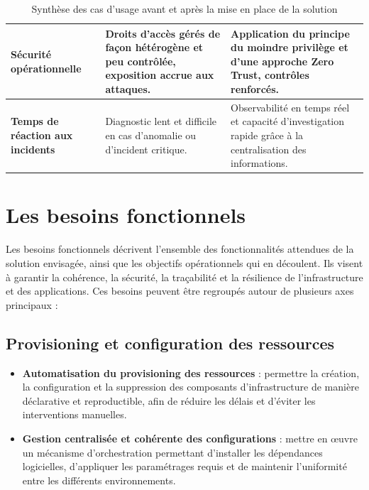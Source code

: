 \begin{table}[H]
\begin{tabular}{|p{4cm}|p{5cm}|p{5cm}|}
		\textbf{Sécurité opérationnelle}                                                                                             &
		Droits d’accès gérés de façon hétérogène et peu contrôlée, exposition accrue aux attaques.                                   &
		Application du principe du moindre privilège et d’une approche Zero Trust, contrôles renforcés.                                                                                                     \\
		\hline

		\textbf{Temps de réaction aux incidents}                                                                                     &
		Diagnostic lent et difficile en cas d’anomalie ou d’incident critique.                                                       &
		Observabilité en temps réel et capacité d’investigation rapide grâce à la centralisation des informations.                                                                                          \\
		\hline

	\end{tabular}
	\caption{Synthèse des cas d'usage avant et après la mise en place de la solution}
	\label{tab:avant_apres}
\end{table}

\section{Les besoins fonctionnels}

Les besoins fonctionnels décrivent l'ensemble des fonctionnalités attendues de la solution envisagée, ainsi que les objectifs opérationnels qui en découlent. Ils visent à garantir la cohérence, la sécurité, la traçabilité et la résilience de l'infrastructure et des applications. Ces besoins peuvent être regroupés autour de plusieurs axes principaux :

\subsection{Provisioning et configuration des ressources}

\begin{itemize}
	\item \textbf{Automatisation du provisioning des ressources} : permettre la création, la configuration et la suppression des composants d'infrastructure de manière déclarative et reproductible, afin de réduire les délais et d'éviter les interventions manuelles.

	\item \textbf{Gestion centralisée et cohérente des configurations} : mettre en œuvre un mécanisme d'orchestration permettant d'installer les dépendances logicielles, d'appliquer les paramétrages requis et de maintenir l'uniformité entre les différents environnements.
\end{itemize}

